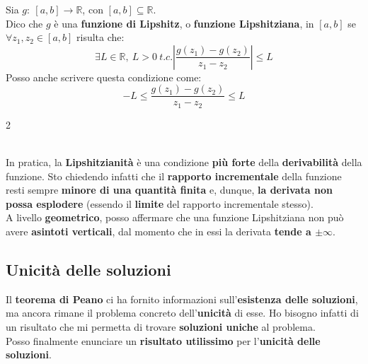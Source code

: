 \documentclass[a4paper, oneside]{article}
\newcommand\R{\mathbb{R}}
\begin{document}
    \begin{inciso}
    Sia $g:\ [a,b]\to\R$, con $[a,b]\subseteq\R$. \\
    Dico che $g$ è una \textbf{funzione di Lipshitz}, o \textbf{funzione Lipshitziana}, in $[a,b]$ se
    $\forall z_1,z_2\in [a,b]$ risulta che:
    \[\exists L\in\R, \ L>0 \ t.c. \left|\frac{g(z_1)-g(z_2)}{z_1-z_2}\right| \leq L\]
    Posso anche scrivere questa condizione come:
    \[-L\leq \frac{g(z_1)-g(z_2)}{z_1-z_2} \leq L\]

    \begin{multicols}{2}
    \columnbreak
    \hfill\\
    \noindent
    In pratica, la \textbf{Lipshitzianità} è una condizione \textbf{più forte} della \textbf{derivabilità} della funzione. 
    Sto chiedendo infatti che il \textbf{rapporto incrementale} della funzione resti sempre \textbf{minore di una quantità finita}
    e, dunque, \textbf{la derivata non possa esplodere} (essendo il \textbf{limite} del rapporto incrementale stesso).\\
    A livello \textbf{geometrico}, posso affermare che una funzione Lipshitziana non può avere \textbf{asintoti verticali}, dal
    momento che in essi la derivata \textbf{tende a $\pm\infty$}.
    \end{multicols}
    \end{inciso}

    \subsection{Unicità delle soluzioni}
    Il \textbf{teorema di Peano} ci ha fornito informazioni sull'\textbf{esistenza delle soluzioni}, ma ancora 
    rimane il problema concreto dell'\textbf{unicità} di esse. Ho bisogno infatti di un risultato che mi permetta
    di trovare \textbf{soluzioni uniche} al problema. \\
    Posso finalmente enunciare un \textbf{risultato utilissimo} per l'\textbf{unicità delle soluzioni}. 
\end{document}
